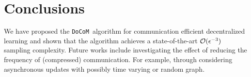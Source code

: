 \documentclass[10pt]{article} %
\theoremstyle{plain}
\theoremstyle{definition}
\theoremstyle{remark}
\newcommand{\aname}{{\tt DoCoM}}
\begin{document}




\section{Conclusions} We have proposed the \aname~algorithm for communication efficient decentralized learning and shown that the algorithm achieves a state-of-the-art ${\cal O}(\epsilon^{-3})$ sampling complexity. Future works include investigating the effect of reducing the frequency of (compressed) communication. For example, through considering asynchronous updates with possibly time varying or random graph.

\end{document}
